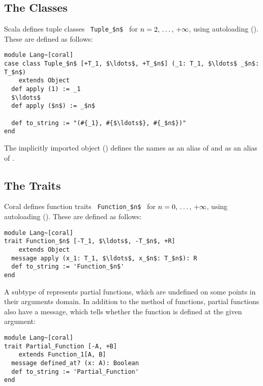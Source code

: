 \subsection{The  Classes}

Scala defines tuple classes ~\lstinline!Tuple_$n$!~ for $n = 2 ,\, \ldots ,\, +\infty$, using autoloading (). These are defined as follows:

\begin{lstlisting}
module Lang~[coral]
case class Tuple_$n$ [+T_1, $\ldots$, +T_$n$] (_1: T_1, $\ldots$ _$n$: T_$n$)
    extends Object
  def apply (1) := _1
  $\ldots$
  def apply ($n$) := _$n$
  
  def to_string := "(#{_1}, #{$\ldots$}, #{_$n$})"
end
\end{lstlisting}

The implicitly imported  object () defines the names  as an alias of  and  as an alias of . 






\subsection{The  Traits}

Coral defines function traits ~\lstinline!Function_$n$!~ for $n = 0 ,\, \ldots ,\, +\infty$, using autoloading (). These are defined as follows: 

\begin{lstlisting}
module Lang~[coral]
trait Function_$n$ [-T_1, $\ldots$, -T_$n$, +R]
    extends Object
  message apply (x_1: T_1, $\ldots$, x_$n$: T_$n$): R
  def to_string := 'Function_$n$'
end
\end{lstlisting}

A subtype of  represents partial functions, which are undefined on some points in their arguments domain. In addition to the  method of functions, partial functions also have a  message, which tells whether the function is defined at the given argument:

\begin{lstlisting}
module Lang~[coral]
trait Partial_Function [-A, +B]
    extends Function_1[A, B]
  message defined_at? (x: A): Boolean
  def to_string := 'Partial_Function'
end
\end{lstlisting}





